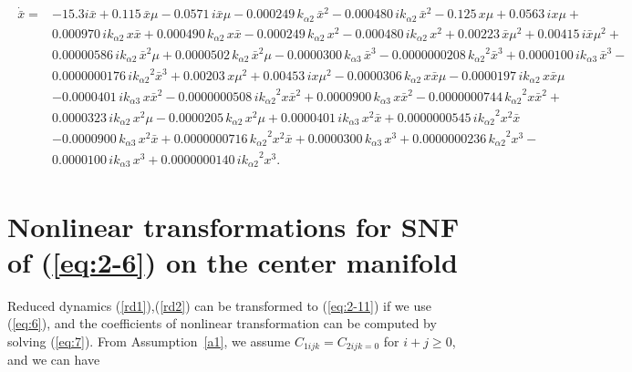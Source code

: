 \documentclass[openacc]{rsproca_new}%
\newcommand{\Eref}[1]{(\ref{#1})}
\newcommand{\asref}[1]{Assumption~\ref{#1}}
\begin{document}
\begin{appendices}
\begin{align}\label{rd2}
\begin{split}
\dot {\bar x}=&- 15.3 i  \bar x+ 0.115\,\bar x\mu- 0.0571\,i\bar x\mu- 0.000249\,{   k_{\alpha 2}}\,{\bar x}^{2}- 0.000480\,i{   k_{\alpha 2}}\,{\bar x}^{2}- 0.125\,x\mu+
0.0563\,ix\mu+\\& 0.000970\,i{   k_{\alpha 2}}\,x\bar x+ 0.000490\,{   k_{\alpha 2}}\,x\bar x-
0.000249\,{   k_{\alpha 2}}\,{x}^{2}- 0.000480\,i{   k_{\alpha 2}}\,{x}^{2}+ 0.00223
\,\bar x{\mu}^{2}+ 0.00415\,i\bar x{\mu}^{2}+ \\&0.00000586\,i{   k_{\alpha 2}}\,{\bar x}^{2}\mu
+ 0.0000502\,{   k_{\alpha 2}}\,{\bar x}^{2}\mu- 0.0000300\,{   k_{\alpha 3}}\,{\bar x}^{3}-
0.0000000208\,{{   k_{\alpha 2}}}^{2}{\bar x}^{3}+ 0.0000100\,i{   k_{\alpha 3}}\,{\bar x}^{3}-\\&
0.0000000176\,i{{   k_{\alpha 2}}}^{2}{\bar x}^{3}+ 0.00203\,x{\mu}^{2}+ 0.00453\,
ix{\mu}^{2}- 0.0000306\,{   k_{\alpha 2}}\,x\bar x\mu- 0.0000197\,i{   k_{\alpha 2}}\,x\bar x\mu
\\&- 0.0000401\,i{   k_{\alpha 3}}\,x{\bar x}^{2}- 0.0000000508\,i{{   k_{\alpha 2}}}^{2}x{\bar x}^
{2}+ 0.0000900\,{   k_{\alpha 3}}\,x{\bar x}^{2}- 0.0000000744\,{{   k_{\alpha 2}}}^{2}x{\bar x}
^{2}+ \\&0.0000323\,i{   k_{\alpha 2}}\,{x}^{2}\mu- 0.0000205\,{   k_{\alpha 2}}\,{x}^{2}
\mu+ 0.0000401\,i{   k_{\alpha 3}}\,{x}^{2}\bar x+ 0.0000000545\,i{{   k_{\alpha 2}}}^{2}{x
}^{2}\bar x\\&- 0.0000900\,{   k_{\alpha 3}}\,{x}^{2}\bar x+ 0.0000000716\,{{   k_{\alpha 2}}}^{2}{
x}^{2}\bar x+ 0.0000300\,{   k_{\alpha 3}}\,{x}^{3}+ 0.0000000236\,{{   k_{\alpha 2}}}^{2}{
x}^{3}- \\&0.0000100\,i{   k_{\alpha 3}}\,{x}^{3}+ 0.0000000140\,i{{   k_{\alpha 2}}}^{2}
{x}^{3}.
\end{split}
\end{align}

\section{Nonlinear transformations for SNF of  \Eref{eq:2-6} on the center manifold} \label{ap2}

Reduced dynamics \Eref{rd1},\Eref{rd2} can be transformed to \Eref{eq:2-11} if we use \Eref{eq:6}, and the coefficients of nonlinear transformation can be computed by solving \Eref{eq:7}. From \asref{a1}, we assume $C_{1ijk}=C_{2ijk=0}$ for $i+j \geq 0$, and we can have


\end{appendices}
\end{document}
